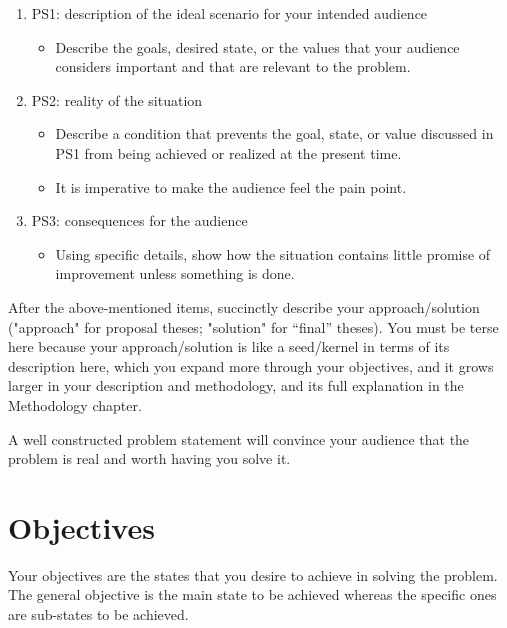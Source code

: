 \begin{enumerate}
	\item PS1: description of the ideal scenario for your intended audience	
	\begin{itemize}
		\item Describe the goals, desired state, or the values that your audience considers important and that are relevant to the problem.
	\end{itemize}
	
	\item PS2:  reality of the situation
	\begin{itemize}
			\item Describe a condition that prevents the goal, state, or value discussed in PS1 from being achieved or realized at the present time.
			\item It is imperative to make the audience feel the pain point.
	\end{itemize}
	
	\item PS3:  consequences for the audience		
	\begin{itemize}
			\item Using specific details, show how the situation contains little promise of improvement unless something is done.
	\end{itemize}

\end{enumerate}

\noindent After the above-mentioned items, succinctly describe your approach/solution ("approach" for proposal theses; "solution" for ``final'' theses). You must be terse here because your approach/solution is like a seed/kernel in terms of its description here, which you expand more through your objectives, and it grows larger in your description and methodology, and its full explanation in the Methodology chapter.

\noindent A well constructed problem statement will convince your audience that the problem is real and worth having you solve it.



\textcolor[rgb]{0.75,0.75,0.75}{\blindtext}



\section{Objectives}

Your objectives are the states that you desire to achieve in solving the problem. The general objective is the main state to be achieved whereas the specific ones are sub-states to be achieved.

